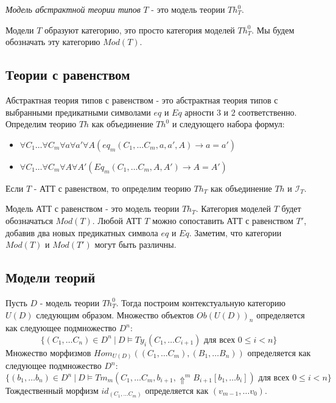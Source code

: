 \documentclass{amsart}
\theoremstyle{definition}
\theoremstyle{remark}
\numberwithin{figure}{section}
\begin{document}
\begin{defn}
\emph{Модель абстрактной теории типов} $T$ - это модель теории $Th^0_T$.
\end{defn}

Модели $T$ образуют категорию, это просто категория моделей $Th^0_T$.
Мы будем обозначать эту категорию $Mod(T)$.

\subsection{Теории с равенством}

Абстрактная теория типов с равенством - это абстрактная теория типов с выбранными предикатными символами $eq$ и $Eq$ арности $3$ и $2$ соответственно.
Определим теорию $Th$ как объединение $Th^0$ и следующего набора формул:
\begin{itemize}
\item $\forall C_1 \ldots \forall C_m \forall a \forall a' \forall A (eq_m(C_1, \ldots C_m, a, a', A) \to a = a')$
\item $\forall C_1 \ldots \forall C_m \forall A \forall A' (Eq_m(C_1, \ldots C_m, A, A') \to A = A')$
\end{itemize}
Если $T$ - АТТ с равенством, то определим теорию $Th_T$ как объединение $Th$ и $\mathcal{I}_T$.

Модель АТТ с равенством - это модель теории $Th_T$.
Категория моделей $T$ будет обозначаться $Mod(T)$.
Любой АТТ $T$ можно сопоставить АТТ с равенством $T'$, добавив два новых предикатных символа $eq$ и $Eq$.
Заметим, что категории $Mod(T)$ и $Mod(T')$ могут быть различны.

\subsection{Модели теорий}

Пусть $D$ - модель теории $Th^0_T$.
Тогда построим контекстуальную категорию $U(D)$ следующим образом.
Множество объектов $Ob(U(D))_n$ определяется как следующее подмножество $D^n$:
\[ \{ (C_1, \ldots C_n) \in D^n\ |\ D \models Ty_i(C_1, \ldots C_{i + 1}) \text{ для всех } 0 \leq i < n \} \]
Множество морфизмов $Hom_{U(D)}((C_1, \ldots C_m), (B_1, \ldots B_n))$ определяется как следующее подмножество $D^n$:
\[ \{ (b_1, \ldots b_n) \in D^n\ |\ D \models Tm_m(C_1, \ldots C_m, b_{i + 1}, \Uparrow^m B_{i + 1}[b_1, \ldots b_i]) \text{ для всех } 0 \leq i < n \} \]
Тождественный морфизм $id_{(C_1, \ldots C_m)}$ определяется как $(v_{m - 1}, \ldots v_0)$.
\end{document}
